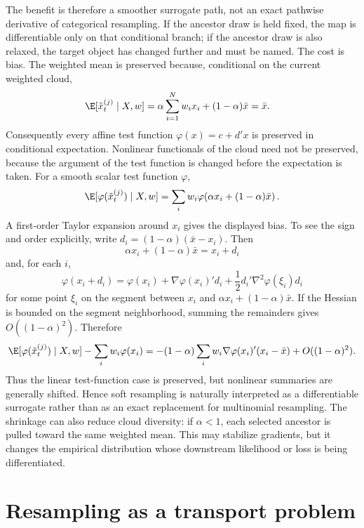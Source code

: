 The benefit is therefore a smoother surrogate path, not an exact pathwise
derivative of categorical resampling.  If the ancestor draw is held fixed, the
map is differentiable only on that conditional branch; if the ancestor draw is
also relaxed, the target object has changed further and must be named.  The
cost is bias.  The weighted mean is preserved because, conditional on the
current weighted cloud,
\begin{align}
\label{eq:bf-dr-soft-mean-preserved}
  \E[\tilde x_t^{(j)} \mid X,w]
  &=
  \alpha \sum_{i=1}^N w_i x_i
  +(1-\alpha)\bar x
  =
  \bar x .
\end{align}
Consequently every affine test function $\varphi(x)=c+d'x$ is preserved in
conditional expectation.  Nonlinear functionals of the cloud need not be
preserved, because the argument of the test function is changed before the
expectation is taken.  For a smooth scalar test function $\varphi$,
\begin{equation}
\label{eq:bf-dr-soft-test-expectation}
  \E[\varphi(\tilde x_t^{(j)}) \mid X,w]
  = \sum_i w_i
      \varphi\!\left(\alpha x_i+(1-\alpha)\bar x\right).
\end{equation}
A first-order Taylor expansion around $x_i$ gives the displayed bias.  To see
the sign and order explicitly, write
$d_i=(1-\alpha)(\bar x-x_i)$.  Then
\[
  \alpha x_i+(1-\alpha)\bar x=x_i+d_i
\]
and, for each $i$,
\[
  \varphi(x_i+d_i)
  =
  \varphi(x_i)
  + \nabla\varphi(x_i)'d_i
  + \frac{1}{2}d_i'\nabla^2\varphi(\xi_i)d_i
\]
for some point $\xi_i$ on the segment between $x_i$ and
$\alpha x_i+(1-\alpha)\bar x$.  If the Hessian is bounded on the segment
neighborhood, summing the remainders gives $O((1-\alpha)^2)$.  Therefore
\begin{equation}
\label{eq:bf-dr-soft-test-bias}
  \E[\varphi(\tilde x_t^{(j)}) \mid X,w]
  - \sum_i w_i\varphi(x_i)
  =
  -(1-\alpha)\sum_i w_i
  \nabla\varphi(x_i)'(x_i-\bar x)
  + O((1-\alpha)^2).
\end{equation}
Thus the linear test-function case is preserved, but nonlinear summaries are
generally shifted.  Hence soft resampling is naturally interpreted as a
differentiable surrogate rather than as an exact replacement for multinomial
resampling.  The shrinkage can also reduce cloud diversity: if
$\alpha<1$, each selected ancestor is pulled toward the same weighted mean.
This may stabilize gradients, but it changes the empirical distribution whose
downstream likelihood or loss is being differentiated.

\section{Resampling as a transport problem}
\label{sec:bf-dr-transport-view}

